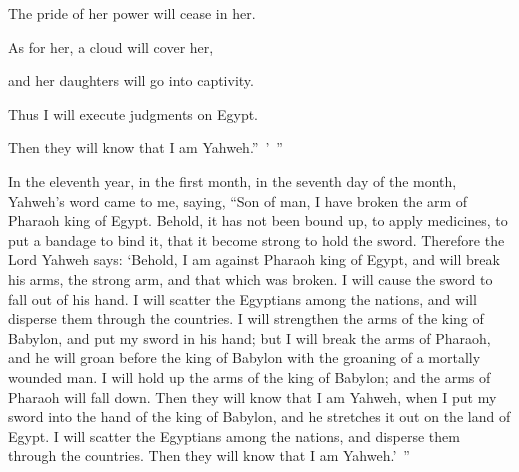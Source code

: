 {\par }{\Q The pride of her power will cease in her.
\par }{\QB As for her, a cloud will cover her,
\par }{\QB and her daughters will go into captivity.
\par }{\Q {}Thus I will execute judgments on Egypt.
\par }{\QB Then they will know that I am Yahweh.” ’ ”
\par }{\BB \par }{\PP {}In the eleventh year, in the first month, in the seventh day of the month, Yahweh’s word came to me, saying,
“Son of man, I have broken the arm of Pharaoh king of Egypt. Behold, it has not been bound up, to apply medicines, to put a bandage to bind it, that it become strong to hold the sword.
Therefore the Lord Yahweh says: ‘Behold, I am against Pharaoh king of Egypt, and will break his arms, the strong arm, and that which was broken. I will cause the sword to fall out of his hand.
I will scatter the Egyptians among the nations, and will disperse them through the countries.
I will strengthen the arms of the king of Babylon, and put my sword in his hand; but I will break the arms of Pharaoh, and he will groan before the king of Babylon with the groaning of a mortally wounded man.
I will hold up the arms of the king of Babylon; and the arms of Pharaoh will fall down. Then they will know that I am Yahweh, when I put my sword into the hand of the king of Babylon, and he stretches it out on the land of Egypt.
I will scatter the Egyptians among the nations, and disperse them through the countries. Then they will know that I am Yahweh.’ ”

}
